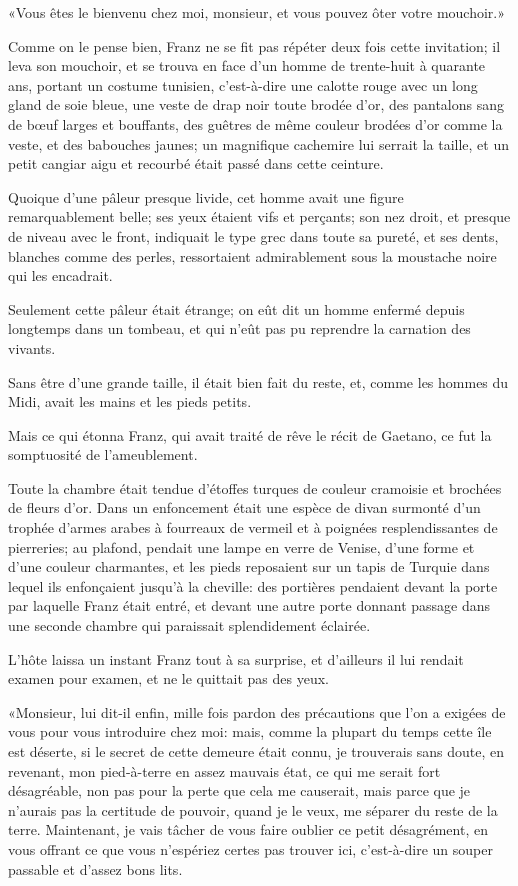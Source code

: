 «Vous êtes le bienvenu chez moi, monsieur, et vous pouvez ôter votre mouchoir.»

Comme on le pense bien, Franz ne se fit pas répéter deux fois cette invitation; il leva son mouchoir, et se trouva en face d'un homme de trente-huit à quarante ans, portant un costume tunisien, c'est-à-dire une calotte rouge avec un long gland de soie bleue, une veste de drap noir toute brodée d'or, des pantalons sang de bœuf larges et bouffants, des guêtres de même couleur brodées d'or comme la veste, et des babouches jaunes; un magnifique cachemire lui serrait la taille, et un petit cangiar aigu et recourbé était passé dans cette ceinture.

Quoique d'une pâleur presque livide, cet homme avait une figure remarquablement belle; ses yeux étaient vifs et perçants; son nez droit, et presque de niveau avec le front, indiquait le type grec dans toute sa pureté, et ses dents, blanches comme des perles, ressortaient admirablement sous la moustache noire qui les encadrait.

Seulement cette pâleur était étrange; on eût dit un homme enfermé depuis longtemps dans un tombeau, et qui n'eût pas pu reprendre la carnation des vivants.

Sans être d'une grande taille, il était bien fait du reste, et, comme les hommes du Midi, avait les mains et les pieds petits.

Mais ce qui étonna Franz, qui avait traité de rêve le récit de Gaetano, ce fut la somptuosité de l'ameublement.

Toute la chambre était tendue d'étoffes turques de couleur cramoisie et brochées de fleurs d'or. Dans un enfoncement était une espèce de divan surmonté d'un trophée d'armes arabes à fourreaux de vermeil et à poignées resplendissantes de pierreries; au plafond, pendait une lampe en verre de Venise, d'une forme et d'une couleur charmantes, et les pieds reposaient sur un tapis de Turquie dans lequel ils enfonçaient jusqu'à la cheville: des portières pendaient devant la porte par laquelle Franz était entré, et devant une autre porte donnant passage dans une seconde chambre qui paraissait splendidement éclairée.

L'hôte laissa un instant Franz tout à sa surprise, et d'ailleurs il lui rendait examen pour examen, et ne le quittait pas des yeux.

«Monsieur, lui dit-il enfin, mille fois pardon des précautions que l'on a exigées de vous pour vous introduire chez moi: mais, comme la plupart du temps cette île est déserte, si le secret de cette demeure était connu, je trouverais sans doute, en revenant, mon pied-à-terre en assez mauvais état, ce qui me serait fort désagréable, non pas pour la perte que cela me causerait, mais parce que je n'aurais pas la certitude de pouvoir, quand je le veux, me séparer du reste de la terre. Maintenant, je vais tâcher de vous faire oublier ce petit désagrément, en vous offrant ce que vous n'espériez certes pas trouver ici, c'est-à-dire un souper passable et d'assez bons lits.

